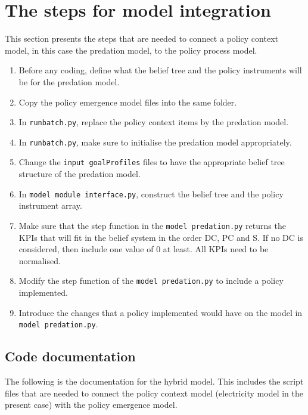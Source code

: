 \documentclass[12pt]{article}
\begin{document}
\section{The steps for model integration}
\label{sec:steps}

This section presents the steps that are needed to connect a policy context model, in this case the predation model, to the policy process model.

\begin{enumerate}
\item Before any coding, define what the belief tree and the policy instruments will be for the predation model.
\item Copy the policy emergence model files into the same folder.
\item In \texttt{runbatch.py}, replace the policy context items by the predation model.
\item In \texttt{runbatch.py}, make sure to initialise the predation model appropriately.
\item Change the \texttt{input goalProfiles} files to have the appropriate belief tree structure of the predation model.
\item In \texttt{model module interface.py}, construct the belief tree and the policy instrument array.
\item Make sure that the step function in the \texttt{model predation.py} returns the KPIs that will fit in the belief system in the order DC, PC and S. If no DC is considered, then include one value of 0 at least. All KPIs need to be normalised.
\item Modify the step function of the \texttt{model predation.py} to include a policy implemented.
\item Introduce the changes that a policy implemented would have on the model in \texttt{model predation.py}.
\end{enumerate}

\subsection{Code documentation}

The following is the documentation for the hybrid model. This includes the script files that are needed to connect the policy context model (electricity model in the present case) with the policy emergence model.
\end{document}
